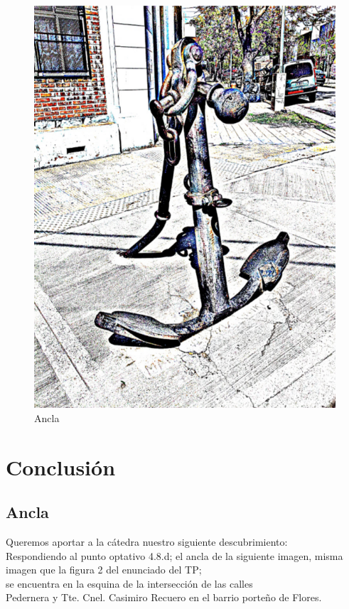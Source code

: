 \begin{figure}
  \begin{center}
    \includegraphics[scale=0.2]{imagenes/ancla.png}
  \end{center}
  \caption{Ancla}
\end{figure}
\par{
\section{Conclusión}
\bigskip
\subsection{Ancla}
}
\bigskip

Queremos aportar a la cátedra nuestro siguiente descubrimiento: \\ 
Respondiendo al punto optativo 4.8.d; el ancla de la siguiente imagen, misma imagen que la figura 2 del enunciado del TP; \\ se encuentra en la esquina de la intersección de las calles \\ Pedernera y Tte. Cnel. Casimiro Recuero en el barrio porteño de Flores.

